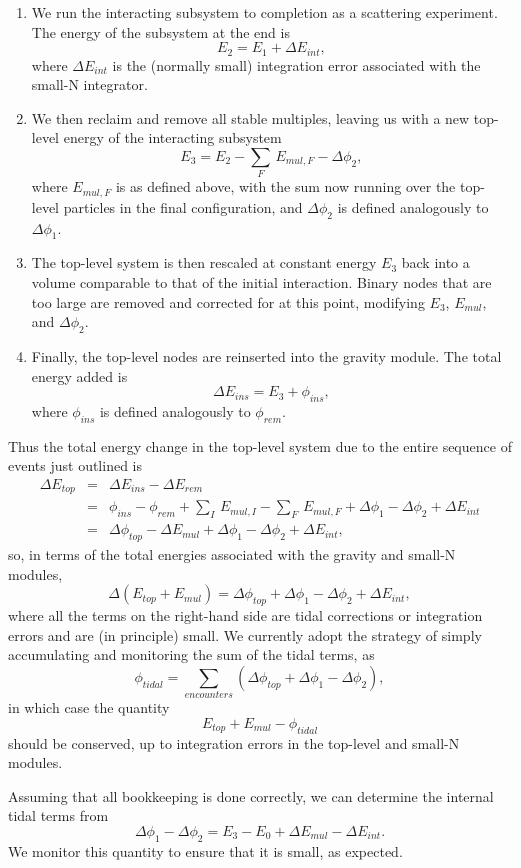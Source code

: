 \documentclass[12pt]{article}
\begin{document}
\begin{enumerate}
\item We run the interacting subsystem to completion as a scattering
  experiment.  The energy of the subsystem at the end is
  $$
	E_2 = E_1 + \Delta E_{int},
  $$
  where $\Delta E_{int}$ is the (normally small) integration error
  associated with the small-N integrator.

\item We then reclaim and remove all stable multiples, leaving us with
  a new top-level energy of the interacting subsystem
  $$
	E_3 = E_2 - \sum_F\,E_{mul,F} - \Delta\phi_2,
  $$
  where $E_{mul,F}$ is as defined above, with the sum now running over
  the top-level particles in the final configuration, and
  $\Delta\phi_2$ is defined analogously to $\Delta\phi_1$.

\item The top-level system is then rescaled at constant energy $E_3$
  back into a volume comparable to that of the initial interaction.
  Binary nodes that are too large are removed and corrected for at
  this point, modifying $E_3$, $E_{mul}$, and $\Delta\phi_2$.

\item Finally, the top-level nodes are reinserted into the gravity
  module.  The total energy added is
  $$
	\Delta E_{ins} = E_3 + \phi_{ins},
  $$
  where $\phi_{ins}$ is defined analogously to $\phi_{rem}$.

\end{enumerate}

Thus the total energy change in the top-level system due to the entire
sequence of events just outlined is
\begin{eqnarray*}
	\Delta E_{top} &=& \Delta E_{ins} - \Delta E_{rem} \\
		      &=& \phi_{ins} - \phi_{rem}
				+ \sum_I\,E_{mul,I} - \sum_F\,E_{mul,F}
 				+ \Delta\phi_1 - \Delta\phi_2
				+ \Delta E_{int} \\
		      &=& \Delta\phi_{top} - \Delta E_{mul} 
 				+ \Delta\phi_1 - \Delta\phi_2
				+ \Delta E_{int},
\end{eqnarray*}
so, in terms of the total energies associated with the gravity and
small-N modules,
$$
	\Delta\left(E_{top}+E_{mul}\right)
		= \Delta\phi_{top} + \Delta\phi_1 - \Delta\phi_2
				  + \Delta E_{int},
$$
where all the terms on the right-hand side are tidal corrections or
integration errors and are (in principle) small.  We currently adopt
the strategy of simply accumulating and monitoring the sum of the
tidal terms, as
$$
	\phi_{tidal} = \sum_{encounters}\left(\Delta\phi_{top}
					    + \Delta\phi_1
					    - \Delta\phi_2\right),
$$
in which case the quantity 
$$
	E_{top} + E_{mul} - \phi_{tidal}
$$
should be conserved, up to integration errors in the top-level and
small-N modules.

Assuming that all bookkeeping is done correctly, we can determine the
internal tidal terms from
$$
	\Delta\phi_1 - \Delta\phi_2 = E_3 - E_0 + \Delta E_{mul}
						- \Delta E_{int}.
$$
We monitor this quantity to ensure that it is small, as expected.
\end{document}
